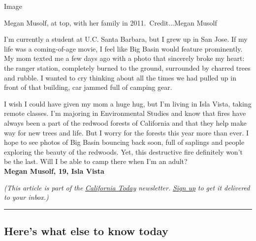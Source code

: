 Image

Megan Musolf, at top, with her family in 2011.~Credit...Megan Musolf

I'm currently a student at U.C. Santa Barbara, but I grew up in San
Jose. If my life was a coming-of-age movie, I feel like Big Basin would
feature prominently. My mom texted me a few days ago with a photo that
sincerely broke my heart: the ranger station, completely burned to the
ground, surrounded by charred trees and rubble. I wanted to cry thinking
about all the times we had pulled up in front of that building, car
jammed full of camping gear.

I wish I could have given my mom a huge hug, but I'm living in Isla
Vista, taking remote classes. I'm majoring in Environmental Studies and
know that fires have always been a part of the redwood forests of
California and that they help make way for new trees and life. But I
worry for the forests this year more than ever. I hope to see photos of
Big Basin bouncing back soon, full of saplings and people exploring the
beauty of the redwoods. Yet, this destructive fire definitely won't be
the last. Will I be able to camp there when I'm an adult?\\
\textbf{Megan Musolf, 19, Isla Vista}

\emph{(This article is part of the}
\href{https://www.nytimes3xbfgragh.onion/column/california-today}{\emph{California
Today}} \emph{newsletter.}
\href{https://www.nytimes3xbfgragh.onion/newsletters/california-today}{\emph{Sign
up}} \emph{to get it delivered to your inbox.)}

\begin{center}\rule{0.5\linewidth}{\linethickness}\end{center}

\hypertarget{heres-what-else-to-know-today}{%
\subsection{Here's what else to know
today}\label{heres-what-else-to-know-today}}

